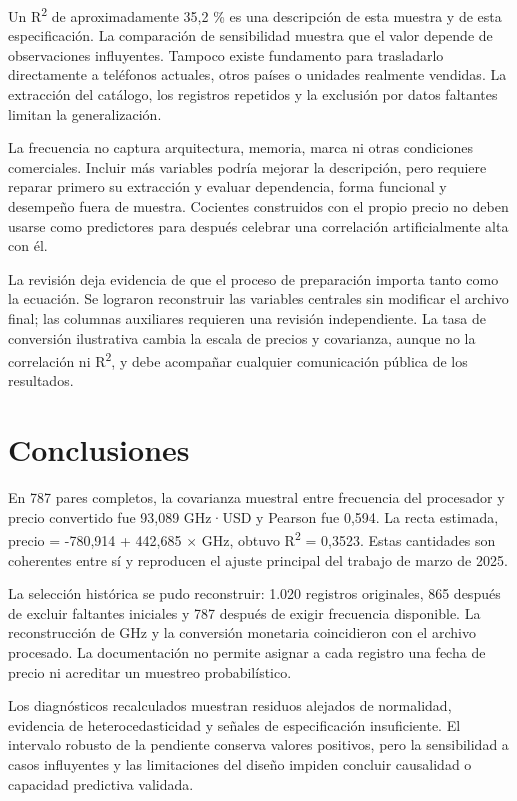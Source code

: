 \documentclass[12pt,letterpaper]{article}
\begin{document}
Un R\textsuperscript{2} de aproximadamente 35,2 \% es una descripción de esta muestra y de esta especificación. La comparación de sensibilidad muestra que el valor depende de observaciones influyentes. Tampoco existe fundamento para trasladarlo directamente a teléfonos actuales, otros países o unidades realmente vendidas. La extracción del catálogo, los registros repetidos y la exclusión por datos faltantes limitan la generalización.

La frecuencia no captura arquitectura, memoria, marca ni otras condiciones comerciales. Incluir más variables podría mejorar la descripción, pero requiere reparar primero su extracción y evaluar dependencia, forma funcional y desempeño fuera de muestra. Cocientes construidos con el propio precio no deben usarse como predictores para después celebrar una correlación artificialmente alta con él.

La revisión deja evidencia de que el proceso de preparación importa tanto como la ecuación. Se lograron reconstruir las variables centrales sin modificar el archivo final; las columnas auxiliares requieren una revisión independiente. La tasa de conversión ilustrativa cambia la escala de precios y covarianza, aunque no la correlación ni R\textsuperscript{2}, y debe acompañar cualquier comunicación pública de los resultados.

\clearpage
\section*{Conclusiones}
En 787 pares completos, la covarianza muestral entre frecuencia del procesador y precio convertido fue 93,089 GHz·USD y Pearson fue 0,594. La recta estimada, precio = -780,914 + 442,685 × GHz, obtuvo R\textsuperscript{2} = 0,3523. Estas cantidades son coherentes entre sí y reproducen el ajuste principal del trabajo de marzo de 2025.

La selección histórica se pudo reconstruir: 1.020 registros originales, 865 después de excluir faltantes iniciales y 787 después de exigir frecuencia disponible. La reconstrucción de GHz y la conversión monetaria coincidieron con el archivo procesado. La documentación no permite asignar a cada registro una fecha de precio ni acreditar un muestreo probabilístico.

Los diagnósticos recalculados muestran residuos alejados de normalidad, evidencia de heterocedasticidad y señales de especificación insuficiente. El intervalo robusto de la pendiente conserva valores positivos, pero la sensibilidad a casos influyentes y las limitaciones del diseño impiden concluir causalidad o capacidad predictiva validada.
\end{document}
